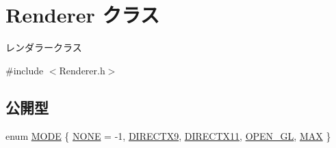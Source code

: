 \hypertarget{class_renderer}{}\section{Renderer クラス}
\label{class_renderer}


レンダラークラス  




{\ttfamily \#include $<$Renderer.\+h$>$}

\subsection*{公開型}
\begin{DoxyCompactItemize}
\item 
enum \mbox{\hyperlink{class_renderer_ab5a9379ccadcf2b3394c61cf8c835fec}{M\+O\+DE}} \{ \newline
\mbox{\hyperlink{class_renderer_ab5a9379ccadcf2b3394c61cf8c835feca2a36637bde744b1f383e4fa8c3c10382}{N\+O\+NE}} = -\/1, 
\mbox{\hyperlink{class_renderer_ab5a9379ccadcf2b3394c61cf8c835feca6b296a07c01bb9de6258ca507e7c4eb6}{D\+I\+R\+E\+C\+T\+X9}}, 
\mbox{\hyperlink{class_renderer_ab5a9379ccadcf2b3394c61cf8c835fecaf72f39863653ad6fe6cb501a566fb714}{D\+I\+R\+E\+C\+T\+X11}}, 
\mbox{\hyperlink{class_renderer_ab5a9379ccadcf2b3394c61cf8c835fecac532ec7ed1c2ce77df467cbf829e575a}{O\+P\+E\+N\+\_\+\+GL}}, 
\newline
\mbox{\hyperlink{class_renderer_ab5a9379ccadcf2b3394c61cf8c835feca3304c74929f96df4042bc148ee9f3b50}{M\+AX}}
 \}
\end{DoxyCompactItemize}
